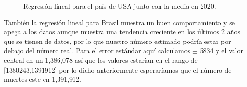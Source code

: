 \documentclass[12pt]{article}
\begin{document}
\begin{figure}[H]
\centering
{}%
\hfill
{}%
\hfill
\caption{Regresión lineal para el país de USA junto con la media en 2020.}

\label{fig:RegresionUSA}
\end{figure}   
\hfill

También la regresión lineal para Brasil muestra un buen comportamiento y se apega a los datos aunque muestra una tendencia creciente en los últimos 2 años que se tienen de datos, por lo que nuestro número estimado podría estar por debajo del número real.
Para el error estándar aquí calculamos $\pm$ 5834 y el valor central en un 
1,386,078 así que los valores estarían en el rango de [1380243,1391912] por lo dicho anteriormente esperaríamos que el número de muertes este en 1,391,912.\\
\end{document}
